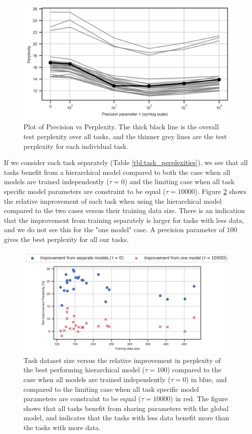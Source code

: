 \documentclass{article}
\begin{document}
\begin{figure}[ht]
    \centering
    \includegraphics[width=\textwidth]{figures/results_plot.png}
    \caption{Plot of Precision vs Perplexity. The thick black line is the overall test perplexity over all tasks, and the thinner grey lines are the test perplexity for each individual task.}
    \label{fig:results_plot}
\end{figure}

If we consider each task separately (Table \ref{tbl:task_perplexities}), we see that all tasks benefit from a hierarchical model compared to both the case when all models are trained independently ($\tau = 0$) and the limiting case when all task specific model parameters are constraint to be equal ($\tau=10000$).
Figure \ref{fig:relative_improvement} shows the relative improvement of each task when using the hierarchical model compared to the two cases versus their training data size. There is an indication that the improvement from training separately is larger for tasks with less data, and we do not see this for the "one model" case.
A precision parameter of $100$ gives the best perplexity for all our tasks.

\begin{figure}[h]
    \centering
    \includegraphics[width=\textwidth]{figures/relative_improvement_combined.png}
    \caption{Task dataset size versus the relative improvement in perplexity of the best performing hierarchical model ($\tau = 100$) compared to the case when all models are trained independently ($\tau = 0$) in blue, and compared to the limiting case when all task specific model parameters are constraint to be equal ($\tau=10000$) in red. 
    The figure shows that all tasks benefit from sharing parameters with the global model, and indicates that the tasks with less data benefit more than the tasks with more data.}
    \label{fig:relative_improvement}
\end{figure}
\end{document}
